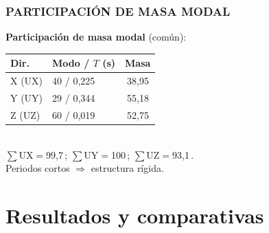 \documentclass[11.5pt,aspectratio=169,handout]{beamer}
\newcommand{\ctitle}[1]{\frametitle{#1}}
\begin{document}
\begin{frame}
\ctitle{PARTICIPACIÓN DE MASA MODAL}
\centering\vspace{4mm}
{\footnotesize\textbf{Participación de masa modal} (común):}\\[4mm]
{\scriptsize
\begin{tabular}{@{}llr@{}}
  \toprule
    Dir. & Modo / $T$ (s) & Masa \\
    \midrule
    X (UX) & 40 / 0,225 & 38,95\,\text{\%} \\
    Y (UY) & 29 / 0,344 & 55,18\,\text{\%} \\
    Z (UZ) & 60 / 0,019 & 52,75\,\text{\%} \\
    \bottomrule
  \end{tabular}}\\[4mm]
  {\scriptsize $\sum$UX$=$99,7\,\text{\%}; $\sum$UY$=$100\,\text{\%}; $\sum$UZ$=$93,1\,\text{\%}.\\[2mm]
  Periodos cortos $\Rightarrow$ estructura \alert{rígida}.}
  \end{frame}

\section{Resultados y comparativas}
\end{document}
